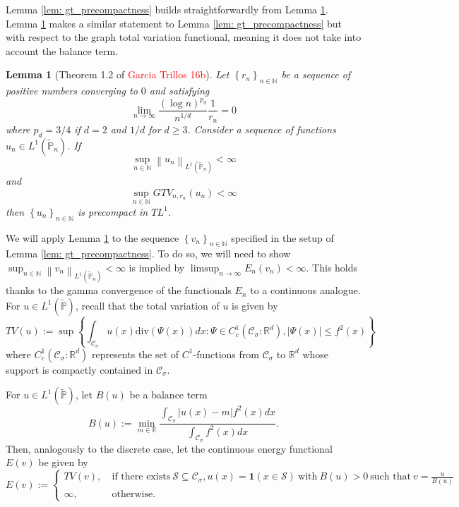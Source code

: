 \documentclass{article}
\newcommand{\Reals}{\mathbb{R}}
\newcommand{\norm}[1]{\left\lVert#1\right\rVert}
\newcommand{\abs}[1]{\left \lvert #1 \right \rvert}
\newcommand{\dive}{\mathrm{div}}
\newcommand{\set}[1]{\left\{#1\right\}}
\newcommand{\seq}[1]{\set{#1}_{n \in \N}}
\newcommand{\Naturals}{\mathbb{N}}
\newcommand{\N}{\mathbb{N}}
\newcommand{\Cset}{\mathcal{C}}
\newcommand{\Sset}{\mathcal{S}}
\newcommand{\Csig}{\Cset_{\sigma}}
\newcommand{\Pbb}{\mathbb{P}}
\newcommand{\1}{\mathbf{1}}
\theoremstyle{alden}
\theoremstyle{aldenthm}
\newtheorem{lemma}{Lemma}
\theoremstyle{remark}
\begin{document}
Lemma \ref{lem: gt_precompactness} builds straightforwardly from Lemma \ref{lem: gt_precompactness_2}. Lemma \ref{lem: gt_precompactness_2} makes a similar statement to Lemma \ref{lem: gt_precompactness} but with respect to the graph total variation functional, meaning it does not take into account the balance term.

\begin{lemma}[Theorem 1.2 of \textcolor{red}{Garcia Trillos 16b}]
	\label{lem: gt_precompactness_2}
	Let $\seq{r_n}$ be a sequence of positive numbers converging to $0$ and satisfying
	\begin{equation}
	\label{eqn: r_conv_rate}
	\lim_{n \to \infty} \frac{(\log n)^{p_d}}{n^{1/d}} \frac{1}{r_n} = 0
	\end{equation}
	where $p_d = 3/4$ if $d = 2$ and $1/d$ for $d \geq 3$. Consider a sequence of functions $u_n \in L^1(\widetilde{\Pbb}_n)$. If
	\begin{equation}
	\label{eqn: bounded_norm}
	\sup_{n \in \Naturals} \norm{u_n}_{L^1(\widetilde{\Pbb}_n)} < \infty
	\end{equation}
	and
	\begin{equation}
	\label{eqn: bounded_GTV}
	\sup_{n \in \Naturals} GTV_{n,r_n}(u_n) < \infty
	\end{equation}
	then $\seq{u_n}$ is precompact in $TL^1$.
\end{lemma}

We will apply Lemma \ref{lem: gt_precompactness_2} to the sequence $\seq{v_n}$ specified in the setup of Lemma \ref{lem: gt_precompactness}. To do so, we will need to show $\sup_{n \in \Naturals} \norm{v_n}_{L^1(\widetilde{\Pbb}_n)} < \infty$ is implied by $\limsup_{n \to \infty} E_n(v_n)  < \infty$. This holds thanks to the gamma convergence of the functionals $E_n$ to a continuous analogue. For $u \in L^1(\widetilde{\Pbb})$, recall that the total variation of $u$ is given by
\begin{equation*}
TV(u) := \sup \set{\int_{\Csig} u(x) \dive(\Psi(x)) dx: \Psi \in C_c^1(\Csig: \Reals^d), \abs{\Psi(x)} \leq f^2(x)}
\end{equation*}
where $C_c^1(\Csig: \Reals^d)$ represents the set of $C^1$-functions from $\Csig$ to $\Reals^d$ whose support is compactly contained in $\Csig$. 

For $u \in L^1(\widetilde{\Pbb})$, let $B(u)$ be a balance term
\begin{equation*}
B(u) := \min_{m \in \Reals} \frac{\int_{\Csig} \abs{u(x) - m} f^2(x) dx}{\int_{\Csig} f^2(x) dx}.
\end{equation*}
Then, analogously to the discrete case, let the continuous energy functional $E(v)$ be given by
\begin{equation*}
E(v) := 
\begin{cases}
TV(v),~ & \text{if there exists}~  \Sset \subseteq \Csig, u(x) = \1(x \in \Sset) ~\text{with}~ B(u) > 0 ~\text{such that}~ v = \frac{u}{B(u)} \\
\infty, & \text{otherwise}.
\end{cases}
\end{equation*}
\end{document}
